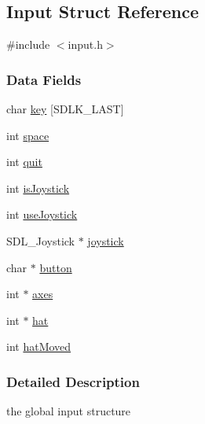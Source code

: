 \hypertarget{struct_input}{\subsection{Input Struct Reference}
\label{struct_input}
}


{\ttfamily \#include $<$input.\-h$>$}

\subsubsection*{Data Fields}
\begin{DoxyCompactItemize}
\item 
char \hyperlink{struct_input_afc4eabd057bd0061b56de4005f5ecbb8}{key} \mbox{[}S\-D\-L\-K\-\_\-\-L\-A\-S\-T\mbox{]}
\item 
int \hyperlink{struct_input_ab05991ed532329184893692211b355fa}{space}
\item 
int \hyperlink{struct_input_a2896431d6a80cd39b3d24b40237612ee}{quit}
\item 
int \hyperlink{struct_input_a163e08d0d19093f658f448710f8e3c49}{is\-Joystick}
\item 
int \hyperlink{struct_input_a66b84ad51037935b993fc2b860b15cb6}{use\-Joystick}
\item 
S\-D\-L\-\_\-\-Joystick $\ast$ \hyperlink{struct_input_a5fe6c6b426f70a21df07c64227b2c337}{joystick}
\item 
char $\ast$ \hyperlink{struct_input_a7f901d4dc1179ea534cb9e5cce0a260b}{button}
\item 
int $\ast$ \hyperlink{struct_input_ae2fe71f7c5edeaa9fc2676be4a93499a}{axes}
\item 
int $\ast$ \hyperlink{struct_input_ab1c8c264ad7cfee584093b1479c03f75}{hat}
\item 
int \hyperlink{struct_input_af7cf3c53ae2105eec18ce989dd3ddae0}{hat\-Moved}
\end{DoxyCompactItemize}


\subsubsection{Detailed Description}
the global input structure 

